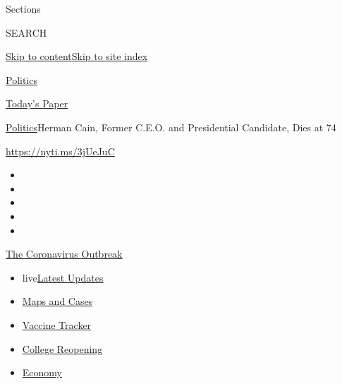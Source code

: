 Sections

SEARCH

\protect\hyperlink{site-content}{Skip to
content}\protect\hyperlink{site-index}{Skip to site index}

\href{https://www.nytimes3xbfgragh.onion/section/politics}{Politics}

\href{https://myaccount.nytimes3xbfgragh.onion/auth/login?response_type=cookie\&client_id=vi}{}

\href{https://www.nytimes3xbfgragh.onion/section/todayspaper}{Today's
Paper}

\href{/section/politics}{Politics}\textbar{}Herman Cain, Former C.E.O.
and Presidential Candidate, Dies at 74

\url{https://nyti.ms/3jUeJuC}

\begin{itemize}
\item
\item
\item
\item
\item
\end{itemize}

\href{https://www.nytimes3xbfgragh.onion/news-event/coronavirus?action=click\&pgtype=Article\&state=default\&region=TOP_BANNER\&context=storylines_menu}{The
Coronavirus Outbreak}

\begin{itemize}
\tightlist
\item
  live\href{https://www.nytimes3xbfgragh.onion/2020/08/04/world/coronavirus-covid-19.html?action=click\&pgtype=Article\&state=default\&region=TOP_BANNER\&context=storylines_menu}{Latest
  Updates}
\item
  \href{https://www.nytimes3xbfgragh.onion/interactive/2020/us/coronavirus-us-cases.html?action=click\&pgtype=Article\&state=default\&region=TOP_BANNER\&context=storylines_menu}{Maps
  and Cases}
\item
  \href{https://www.nytimes3xbfgragh.onion/interactive/2020/science/coronavirus-vaccine-tracker.html?action=click\&pgtype=Article\&state=default\&region=TOP_BANNER\&context=storylines_menu}{Vaccine
  Tracker}
\item
  \href{https://www.nytimes3xbfgragh.onion/2020/08/02/us/covid-college-reopening.html?action=click\&pgtype=Article\&state=default\&region=TOP_BANNER\&context=storylines_menu}{College
  Reopening}
\item
  \href{https://www.nytimes3xbfgragh.onion/live/2020/08/03/business/stock-market-today-coronavirus?action=click\&pgtype=Article\&state=default\&region=TOP_BANNER\&context=storylines_menu}{Economy}
\end{itemize}

